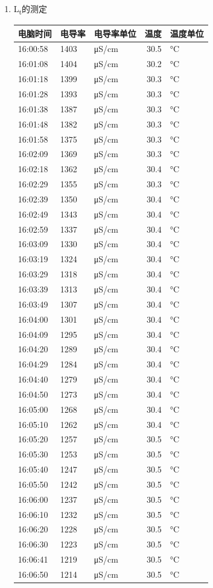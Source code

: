 \documentclass[11pt]{article}
\begin{document}
\begin{enumerate}
\item L\textsubscript{t}的测定
\label{sec:orga1b6490}
\begin{center}
\begin{tabular}{l|lp{3cm}r|l}
电脑时间 & 电导率 & 电导率单位 & 温度 & 温度单位\\
\hline
16:00:58 & 1403 & μS/cm & 30.5 & °C\\
16:01:08 & 1404 & μS/cm & 30.2 & °C\\
16:01:18 & 1399 & μS/cm & 30.3 & °C\\
16:01:28 & 1393 & μS/cm & 30.3 & °C\\
16:01:38 & 1387 & μS/cm & 30.3 & °C\\
16:01:48 & 1382 & μS/cm & 30.3 & °C\\
16:01:58 & 1375 & μS/cm & 30.3 & °C\\
16:02:09 & 1369 & μS/cm & 30.3 & °C\\
16:02:18 & 1362 & μS/cm & 30.4 & °C\\
16:02:29 & 1355 & μS/cm & 30.3 & °C\\
16:02:39 & 1350 & μS/cm & 30.4 & °C\\
16:02:49 & 1343 & μS/cm & 30.4 & °C\\
16:02:59 & 1337 & μS/cm & 30.4 & °C\\
16:03:09 & 1330 & μS/cm & 30.4 & °C\\
16:03:19 & 1324 & μS/cm & 30.4 & °C\\
16:03:29 & 1318 & μS/cm & 30.4 & °C\\
16:03:39 & 1313 & μS/cm & 30.4 & °C\\
16:03:49 & 1307 & μS/cm & 30.4 & °C\\
16:04:00 & 1301 & μS/cm & 30.4 & °C\\
16:04:09 & 1295 & μS/cm & 30.4 & °C\\
16:04:20 & 1289 & μS/cm & 30.4 & °C\\
16:04:29 & 1284 & μS/cm & 30.4 & °C\\
16:04:40 & 1279 & μS/cm & 30.4 & °C\\
16:04:50 & 1273 & μS/cm & 30.4 & °C\\
16:05:00 & 1268 & μS/cm & 30.4 & °C\\
16:05:10 & 1262 & μS/cm & 30.4 & °C\\
16:05:20 & 1257 & μS/cm & 30.5 & °C\\
16:05:30 & 1253 & μS/cm & 30.5 & °C\\
16:05:40 & 1247 & μS/cm & 30.5 & °C\\
16:05:50 & 1242 & μS/cm & 30.5 & °C\\
16:06:00 & 1237 & μS/cm & 30.5 & °C\\
16:06:10 & 1232 & μS/cm & 30.5 & °C\\
16:06:20 & 1228 & μS/cm & 30.5 & °C\\
16:06:30 & 1223 & μS/cm & 30.5 & °C\\
16:06:41 & 1219 & μS/cm & 30.5 & °C\\
16:06:50 & 1214 & μS/cm & 30.5 & °C\\
\end{tabular}
\end{center}



\end{enumerate}
\end{document}
